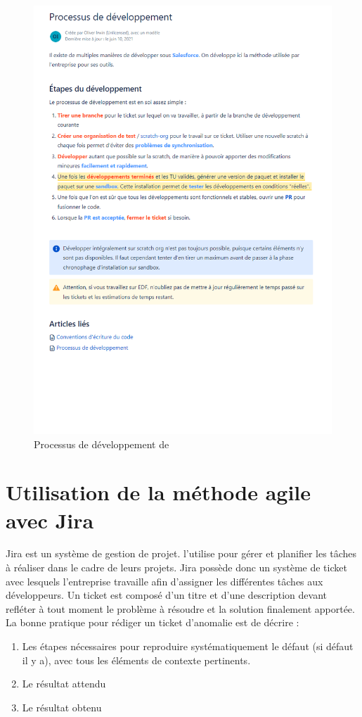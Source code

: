 \documentclass[12pt,oneside,noprintercorrection]{iut}
\begin{document}
\begin{figure}[!ht]
  \centering
  \includegraphics[width=15cm]{img/processDev.png}
  \caption{Processus de développement de\gz{}}
\end{figure}

\clearpage

\section{Utilisation de la méthode agile avec Jira}
Jira est un système de gestion de projet. \gz{} l'utilise pour gérer et planifier les tâches à réaliser dans le cadre de leurs projets. Jira possède donc un système de ticket avec lesquels l'entreprise travaille afin d'assigner les différentes tâches aux développeurs. Un ticket est composé d'un titre et d'une description devant refléter à tout moment le problème à résoudre et la solution finalement apportée. La bonne pratique pour rédiger un ticket d'anomalie est de décrire : 
\begin{enumerate}
    \item Les étapes nécessaires pour reproduire systématiquement le défaut (si défaut il y a), avec tous les éléments de contexte pertinents.
    \item Le résultat attendu
    \item Le résultat obtenu
\end{enumerate}
\end{document}
